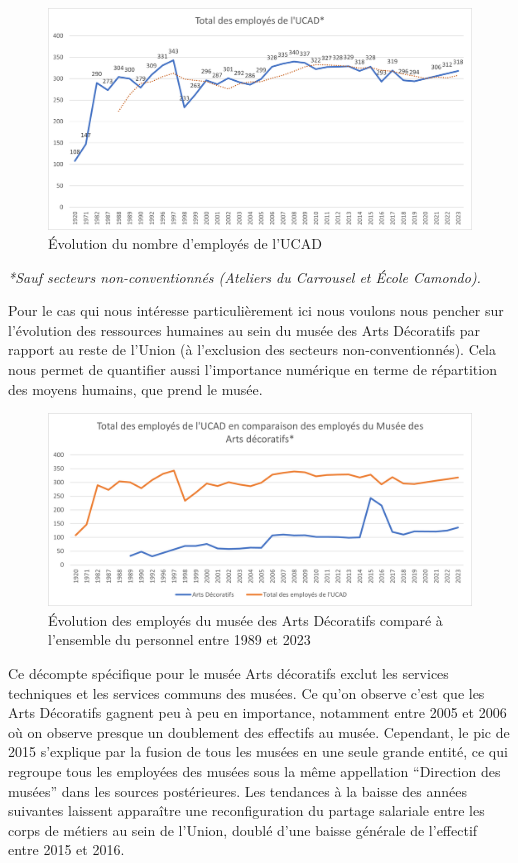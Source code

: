 \begin{figure}[H]
    \centering
    \includegraphics[width=0.75\linewidth]{Illustrations/Image8.png}
    \caption{Évolution du nombre d'employés de l'UCAD}
    \label{fig:placeholder}
\end{figure}

\textit{*Sauf secteurs non-conventionnés (Ateliers du Carrousel et École Camondo).}

Pour le cas qui nous intéresse particulièrement ici nous voulons nous pencher sur l'évolution des ressources humaines au sein du musée des Arts Décoratifs par rapport au reste de l'Union (à l'exclusion des secteurs non-conventionnés). Cela nous permet de quantifier aussi l'importance numérique en terme de répartition des moyens humains, que prend le musée. 

\begin{figure}[H]
    \centering
    \includegraphics[width=0.75\linewidth]{Illustrations/Image10.png}
    \caption{Évolution des employés du musée des Arts Décoratifs comparé à l'ensemble du personnel entre 1989 et 2023}
    \label{fig:placeholder}
\end{figure}

Ce décompte spécifique pour le musée Arts décoratifs exclut les services techniques et les services communs des musées. Ce qu'on observe c'est que les Arts Décoratifs gagnent peu à peu en importance, notamment entre 2005 et 2006 où on observe presque un doublement des effectifs au musée. Cependant, le pic de 2015 s'explique par la fusion de tous les musées en une seule grande entité, ce qui regroupe tous les employé\wokisme e\wokisme s des musées sous la même appellation \enquote{Direction des musées} dans les sources postérieures. Les tendances à la baisse des années suivantes laissent apparaître une reconfiguration du partage salariale entre les corps de métiers au sein de l'Union, doublé d'une baisse générale de l'effectif entre 2015 et 2016. \hfill \break

